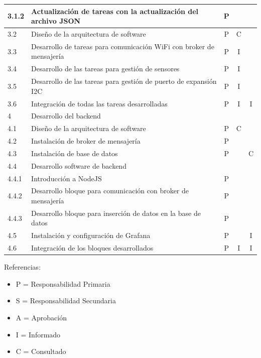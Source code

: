 \documentclass[11pt]{charter}
\begin{document}
\begin{table}[htpb]
{\begin{tabular}{|l|l|c|c|c|}
3.1.2	 & Actualización de tareas con la actualización del archivo JSON         & P &   &   \\ \hline
3.2      & Diseño de la arquitectura de software                                 & P & C &   \\ \hline
3.3      & Desarrollo de tareas para comunicación WiFi con broker de mensajería & P & I &   \\ \hline
3.4      & Desarrollo de las tareas para gestión de sensores                     & P & I &   \\ \hline
3.5      & Desarrollo de las tareas para gestión de puerto de expansión I2C      & P & I &   \\ \hline
3.6      & Integración de todas las tareas desarrolladas                         & P & I & I \\ \hline
4        & \multicolumn{4}{l|}{Desarrollo del backend}                                       \\ \hline
4.1      & Diseño de la arquitectura de software                                 & P & C &   \\ \hline
4.2      & Instalación de broker de mensajería                                  & P &   &   \\ \hline
4.3      & Instalación de base de datos                                          & P &   & C \\ \hline
4.4      & \multicolumn{4}{l|}{Desarrollo software de backend}                               \\ \hline
4.4.1    & Introducción a NodeJS                                                 & P &   &   \\ \hline
4.4.2    & Desarrollo bloque para comunicación con broker de mensajería         & P &   &   \\ \hline
4.4.3    & Desarrollo bloque para inserción de datos en la base de datos         & P &   &   \\ \hline
4.5      & Instalación y configuración de Grafana                                & P &   & I \\ \hline
4.6      & Integración de los bloques desarrollados                              & P & I & I \\ \hline
\end{tabular}%
}
\end{table}

{\footnotesize
Referencias:
\begin{itemize}
	\item P = Responsabilidad Primaria
	\item S = Responsabilidad Secundaria
	\item A = Aprobación
	\item I = Informado
	\item C = Consultado
\end{itemize}
} %
\end{document}
